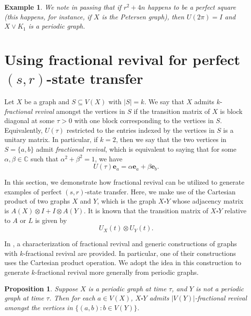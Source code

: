 \documentclass{article}
\numberwithin{equation}{section}
\newtheorem{prop}[lemma]{Proposition}
\newtheorem{ex}[lemma]{Example}
\newcommand{\be}{\mathbf e}
\def\C{\mathbb{C}}
\begin{document}
{\begin{ex}
{We note in passing that if $r^2+4n$ happens to be a perfect square (this happens, for instance, if $X$ is the Petersen graph), then $U(2 \pi)=I$ and $X\vee K_1$ is a periodic graph.}    
\end{ex}




\section{Using fractional revival for perfect $(s,r)$-state transfer}\label{sec:FR}

Let $X$ be a graph and $S\subseteq V(X)$ with $|S|=k$. We say that $X$ admits $k$-\textit{fractional revival} amongst the vertices in $S$ if the transition matrix of $X$ is block diagonal at some $\tau>0$ with one block corresponding to the vertices in $S$. Equivalently, $U(\tau)$ restricted to the entries indexed by the vertices in $S$ is a unitary matrix. In particular, if $k=2$, then we say that the two vertices in $S=\{a,b\}$ admit \textit{fractional revival}, which is equivalent to saying that for some $\alpha,\beta\in\C$ such that $\alpha^2+\beta^2=1$, we have
\begin{equation*}
U(\tau)\be_a=\alpha\be_a+\beta\be_b.
\end{equation*}

In this section, we demonstrate how fractional revival can be utilized to generate examples of perfect $(s,r)$-state transfer. Here, we make use of the Cartesian product of two graphs $X$ and $Y$, which is the graph $X\square Y$ whose adjacency matrix is $A(X)\otimes I+I\otimes A(Y)$. It is known that the transition matrix of $X\square Y$ relative to $A$ or $L$ is given by
\begin{equation*}
U_X(t)\otimes U_Y(t).
\end{equation*}

In \cite{chan2019quantum}, a characterization of fractional revival and generic constructions of graphs with $k$-fractional revival are provided. In particular, one of their constructions \cite[Corollary 3.2]{chan2019quantum} uses the Cartesian product operation. We adopt the idea in this construction to generate $k$-fractional revival more generally from periodic graphs.

\begin{prop}
\label{propCartprod}
Suppose $X$ is a periodic graph at time $\tau$, and $Y$ is not a periodic graph at time $\tau$. Then for each $a\in V(X)$, $X\square Y$ admits $|V(Y)|$-fractional revival amongst the vertices in $\{(a,b):b\in V(Y)\}$.
\end{prop}

}
\end{document}
